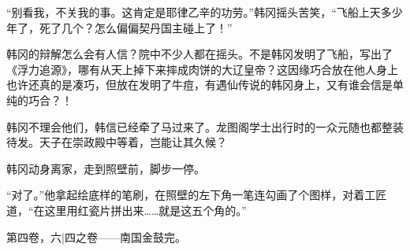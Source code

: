 “别看我，不关我的事。这肯定是耶律乙辛的功劳。”韩冈摇头苦笑，“飞船上天多少年了，死了几个？怎么偏偏契丹国主碰上了！”

韩冈的辩解怎么会有人信？院中不少人都在摇头。不是韩冈发明了飞船，写出了《浮力追源》，哪有从天上掉下来摔成肉饼的大辽皇帝？这因缘巧合放在他人身上也许还真的是凑巧，但放在发明了牛痘，有遇仙传说的韩冈身上，又有谁会信是单纯的巧合？！

韩冈不理会他们，韩信已经牵了马过来了。龙图阁学士出行时的一众元随也都整装待发。天子在崇政殿中等着，岂能让其久候？

韩冈动身离家，走到照壁前，脚步一停。

“对了。”他拿起绘底样的笔刷，在照壁的左下角一笔连勾画了个图样，对着工匠道，“在这里用红瓷片拼出来……就是这五个角的。”

第四卷，六|四之卷——南国金鼓完。

